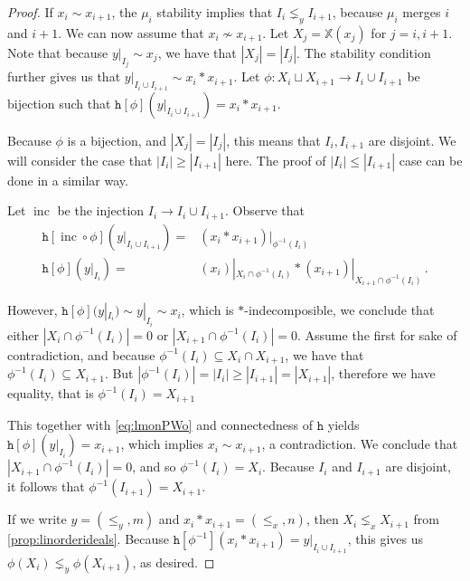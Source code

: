 \documentclass[12pt, reqno]{amsart}
\theoremstyle{definition}
\DeclareMathOperator{\inc}{\mathrm{inc}}
\begin{document}
\begin{proof}
If $x_i \sim x_{i+1}$, the $\mu_i$ stability implies that $I_i \lneq_y I_{i+1}$, because $\mu_i$ merges $i$ and $i+1$.
We can now assume that $x_i \not\sim x_{i+1}$.
Let $X_j = \mathbb{X}(x_j)$ for $j = i, i+1$.
Note that because $y|_{I_j} \sim x_j$, we have that $|X_j| = |I_j|$.
The stability condition further gives us that $y|_{I_i \cup I_{i+1}} \sim x_i \ast x_{i+1}$.
Let $\phi : X_i \sqcup X_{i+1} \to  I_i \cup I_{i+1}$ be bijection such that $\mathtt{h}[\phi](y|_{ I_i \cup I_{i+1}}) = x_i \ast x_{i+1}$.

Because $\phi$ is a bijection, and $|X_j| = |I_j|$, this means that $I_i, I_{i+1}$ are disjoint.
We will consider the case that $|I_i| \geq |I_{i+1}|$ here.
The proof of $|I_i| \leq |I_{i+1}|$ case can be done in a similar way.

Let $\inc $ be the injection $I_i \to I_i \cup I_{i+1}$.
Observe that
\begin{equation}\label{eq:lmonPWo}
    \begin{split}
        \mathtt{h}[\inc \circ \phi](y|_{I_i \cup I_{i+1}}) =& (x_i \ast x_{i+1})|_{\phi^{-1}(I_i)}\\
        \mathtt{h}[\phi](y|_{I_i}) =& (x_i)|_{X_i \cap \phi^{-1}(I_i)} \ast (x_{i+1})|_{X_{i+1} \cap \phi^{-1}(I_i)}\, .
    \end{split}
\end{equation}

However, $\mathtt{h}[\phi](y|_{I_i}) \sim y|_{I_i} \sim x_i$, which is $\ast$-indecomposible, we conclude that either $|X_i \cap \phi^{-1}(I_i)| = 0 $ or $|X_{i+1} \cap \phi^{-1}(I_i)| = 0$.
Assume the first for sake of contradiction, and because $\phi^{-1}(I_i) \subseteq X_i \cap X_{i+1}$, we have that $\phi^{-1}(I_i) \subseteq X_{i+1}$.
But $|\phi^{-1}(I_i)| = |I_i| \geq |I_{i+1}| = |X_{i+1}|$, therefore we have equality, that is $\phi^{-1}(I_i) = X_{i+1}$

This together with \eqref{eq:lmonPWo} and connectedness of $\mathtt{h}$ yields $\mathtt{h}[\phi](y|_{I_i}) = x_{i+1}$, which implies $x_i \sim x_{i+1}$, a contradiction.
We conclude that $|X_{i+1} \cap \phi^{-1}(I_i)| = 0$, and so $\phi^{-1}(I_i) = X_i$.
Because $I_i$ and $I_{i+1}$ are disjoint, it follows that $\phi^{-1}(I_{i+1}) = X_{i+1}$.

If we write $y = (\leq_y, m)$ and $x_i \ast x_{i+1} = (\leq_x, n)$, then $X_i \lneq_x X_{i+1}$ from \cref{prop:linorderideals}.
Because $\mathtt{h}[\phi^{-1}](x_i \ast x_{i+1}) = y|_{I_i \cup I_{i+1}}$, this gives us $\phi(X_i) \lneq_y \phi(X_{i+1})$, as desired.
\end{proof}
\end{document}
